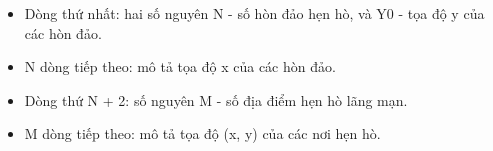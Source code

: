 \begin{itemize}
	\item     Dòng thứ nhất: hai số nguyên N - số hòn đảo hẹn hò, và Y0 - tọa độ y của các hòn đảo.   
	\item     N dòng tiếp theo: mô tả tọa độ x của các hòn đảo.   
	\item     Dòng thứ N + 2: số nguyên M - số địa điểm hẹn hò lãng mạn.   
	\item     M dòng tiếp theo: mô tả tọa độ (x, y) của các nơi hẹn hò.   
\end{itemize}